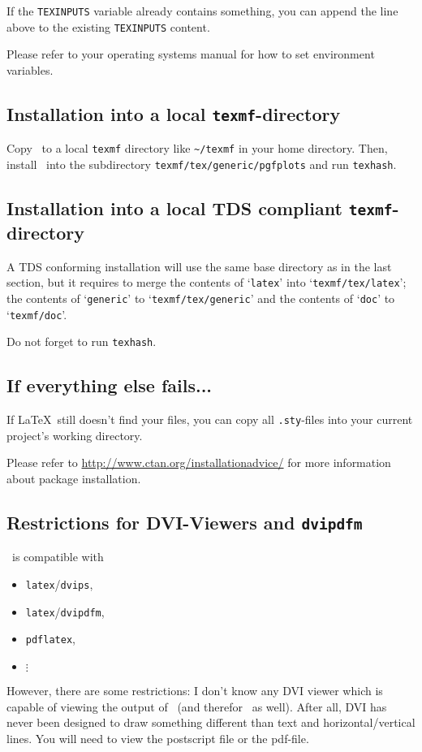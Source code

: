 If the \texttt{TEXINPUTS} variable already contains something, you can append the line above to the existing \texttt{TEXINPUTS} content.

Please refer to your operating systems manual for how to set environment variables.

\subsection{Installation into a local \texttt{texmf}-directory}
Copy \PGFPlots\ to a local \texttt{texmf} directory like \lstinline!~/texmf! in your home directory. Then, install \PGFPlots\ into the subdirectory \lstinline!texmf/tex/generic/pgfplots! and run \lstinline!texhash!.

\subsection{Installation into a local TDS compliant \texttt{texmf}-directory}
A TDS conforming installation will use the same base directory as in the last section, but it requires to merge the contents of `\texttt{latex}' into `\texttt{texmf/tex/latex}'; the contents of `\texttt{generic}' to `\texttt{texmf/tex/generic}' and the contents of `\texttt{doc}' to `\texttt{texmf/doc}'.

Do not forget to run \lstinline!texhash!.

\subsection{If everything else fails...}
If \LaTeX\ still doesn't find your files, you can copy all \lstinline!.sty!-files into your current project's working directory.

Please refer to \url{http://www.ctan.org/installationadvice/} for more information about package installation.



\subsection{Restrictions for DVI-Viewers and \texttt{dvipdfm}}
\PGF\ is compatible with 
\begin{itemize}
	\item \lstinline!latex!/\lstinline!dvips!,
	\item \lstinline!latex!/\lstinline!dvipdfm!,
	\item \lstinline!pdflatex!,
	\item $\vdots$
\end{itemize}
However, there are some restrictions: I don't know any DVI viewer which is capable of viewing the output of \PGF\ (and therefor \PGFPlots\ as well). After all, DVI has never been designed to draw something different than text and horizontal/vertical lines. You will need to view the postscript file or the pdf-file.

